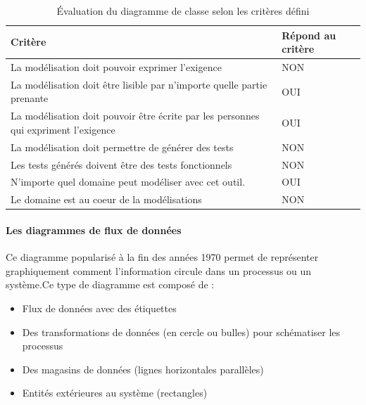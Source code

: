         \begin{table}[H]
        \centering
         \begin{tabular}{|p{25em}|p{5em}|} 
         \hline
        Critère & Répond au critère \\ [0.5ex] 
         \hline
         La modélisation doit pouvoir exprimer l’exigence & \cellcolor[HTML]{D03737}NON\\
         \hline
        La modélisation doit être lisible par n’importe quelle partie prenante & \cellcolor[HTML]{699A73}OUI\\
         \hline
        La modélisation doit pouvoir être écrite par les personnes qui expriment l’exigence &\cellcolor[HTML]{699A73} OUI \\
         \hline
        La modélisation doit permettre de générer des tests & \cellcolor[HTML]{D03737}NON \\
         \hline
        Les tests générés doivent être des tests fonctionnels &\cellcolor[HTML]{D03737} NON\\ 
         \hline
        N’importe quel domaine peut modéliser avec cet outil.&\cellcolor[HTML]{699A73} OUI\\ 
         \hline
        Le domaine est au coeur de la modélisations &\cellcolor[HTML]{D03737} NON\\ 
        \hline 
        \end{tabular}
        \caption{Évaluation du diagramme de classe selon les critères défini}
        \end{table}


    \paragraph{Les diagrammes de flux de données}

    Ce diagramme popularisé à la fin des années 1970 permet de représenter graphiquement comment l'information circule dans un processus ou un système.Ce type de diagramme est composé de :
    \begin{itemize}
        \item Flux de données avec des étiquettes 
        \item Des transformations de données (en cercle ou bulles) pour schématiser les processus
        \item Des magasins de données (lignes horizontales parallèles)
        \item Entités extérieures au système (rectangles)
    \end{itemize}

